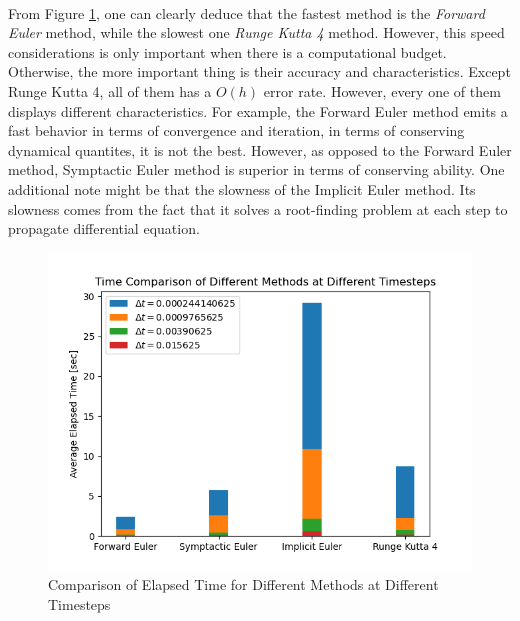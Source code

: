 \documentclass[letterpaper,12pt]{article}
\begin{document}
\paragraph{} From Figure \ref{fig:5}, one can clearly deduce that the fastest method is the \textit{Forward Euler} method, while the slowest one \textit{Runge Kutta 4} method. However, this speed considerations is only important when there is a computational budget. Otherwise, the more important thing is their accuracy and characteristics. Except Runge Kutta 4, all of them has a $O(h)$ error rate. However, every one of them displays different characteristics. For example, the Forward Euler method emits a fast behavior in terms of convergence and iteration, in terms of conserving dynamical quantites, it is not the best. However, as opposed to the Forward Euler method, Symptactic Euler method is superior in terms of conserving ability. One additional note might be that the slowness of  the Implicit Euler method. Its slowness comes from the fact that it solves a root-finding problem at each step to propagate differential equation.
    \begin{figure}[H]
    \centerline{\includegraphics[width=0.9\linewidth]{figures/5.png}}
    \caption{Comparison of Elapsed Time for Different Methods at Different Timesteps}
    \label{fig:5}
    \end{figure}
    
\end{document}
